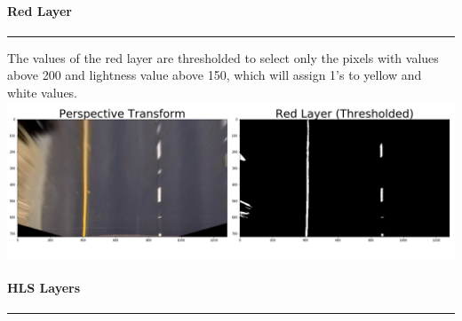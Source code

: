 \documentclass[11pt]{article}
\makeatletter
\def\maxwidth{\ifdim\Gin@nat@width>\linewidth\linewidth
    \else\Gin@nat@width\fi}
\let\Oldincludegraphics\includegraphics
\renewcommand{\includegraphics}[1]{\Oldincludegraphics[width=.8\maxwidth]{#1}}
\makeatother
\begin{document}
\hypertarget{red-layer}{%
\paragraph{Red Layer}\label{red-layer}}

\begin{center}\rule{0.5\linewidth}{\linethickness}\end{center}

The values of the red layer are thresholded to select only the pixels
with values above 200 and lightness value above 150, which will assign
1's to yellow and white values.
\includegraphics{./output_images/writeup_images/straight_lines1_red.png}

\hypertarget{hls-layers}{%
\paragraph{HLS Layers}\label{hls-layers}}

\begin{center}\rule{0.5\linewidth}{\linethickness}\end{center}
\end{document}
